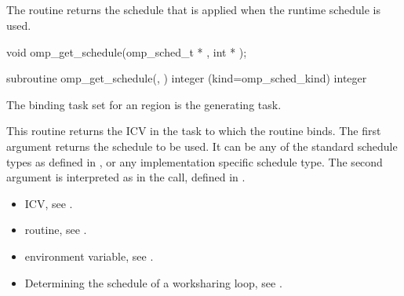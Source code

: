 \subsection{}
\label{subsec:omp_get_schedule}
\summary
The  routine returns the schedule that is applied when the 
runtime schedule is used. 
\format
\ccppspecificstart
\begin{boxedcode}
void omp\_get\_schedule(omp\_sched\_t * , int * ); 
\end{boxedcode}
\ccppspecificend

\fortranspecificstart
\begin{boxedcode}
subroutine omp\_get\_schedule(, ) 
integer (kind=omp\_sched\_kind)  
integer 
\end{boxedcode}
\fortranspecificend

\binding
The binding task set for an  region is the generating task. 

\effect
This routine returns the  ICV in the task to which the routine binds. The 
first argument  returns the schedule to be used. It can be any of the standard 
schedule types as defined in 
, 
or any implementation specific 
schedule type. The second argument is interpreted as in the  call, 
defined in 
.

\crossreferences
\begin{itemize}
\item {} ICV, see 
.

\item {} routine, see 
.

\item {} environment variable, see 
.

\item Determining the schedule of a worksharing loop, see 
.
\end{itemize}









